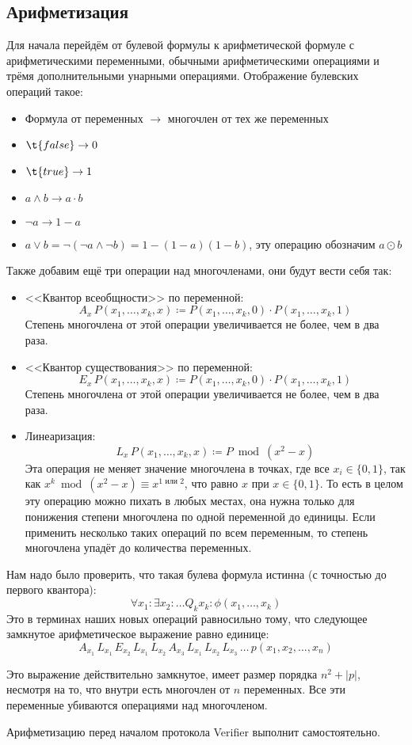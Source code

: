\subsection{Арифметизация}
	Для начала перейдём от булевой формулы к арифметической формуле с арифметическими переменными, обычными арифметическими операциями и трёмя дополнительными унарными операциями.
	Отображение булевских операций такое:
	\begin{itemize}
		\item Формула от переменных $\to$ многочлен от тех же переменных
		\item $\t{false} \to 0$
		\item $\t{true} \to 1$
		\item $a \land b \to a \cdot b$
		\item $\lnot a \to 1 - a$
		\item $a \lor b = \lnot (\lnot a \land \lnot b) = 1 - (1-a)(1-b)$, эту операцию обозначим $a \odot b$
	\end{itemize}
	Также добавим ещё три операции над многочленами, они будут вести себя так:
	\begin{itemize}
		\item <<Квантор всеобщности>> по переменной:
			\[ A_x\,P(x_1, \dots, x_k, x) \coloneq P(x_1, \dots, x_k, 0) \cdot P(x_1, \dots, x_k, 1) \]
			Степень многочлена от этой операции увеличивается не более, чем в два раза.
		\item <<Квантор существования>> по переменной:
			\[ E_x\,P(x_1, \dots, x_k, x) \coloneq P(x_1, \dots, x_k, 0) \cdot P(x_1, \dots, x_k, 1) \]
			Степень многочлена от этой операции увеличивается не более, чем в два раза.
		\item Линеаризация:
			\[ L_x\,P(x_1, \dots, x_k, x) \coloneq P \bmod (x^2 - x) \]
			Эта операция не меняет значение многочлена в точках, где все $x_i \in \{0, 1\}$, так как $x^k \bmod (x^2-x) \equiv x^{1\text{~или~}2}$,
			что равно $x$ при $x \in \{0, 1\}$.
			То есть в целом эту операцию можно пихать в любых местах, она нужна только для понижения степени многочлена по одной переменной до единицы.
			Если применить несколько таких операций по всем переменным, то степень многочлена упадёт до количества переменных.
	\end{itemize}
	Нам надо было проверить, что такая булева формула истинна (с точностью до первого квантора):
	\[ \forall x_1 \colon \exists x_2 \colon \dots Q_k x_k \colon \phi(x_1, \dots, x_k) \]
	Это в терминах наших новых операций равносильно тому, что следующее замкнутое арифметическое выражение равно единице:
	\[
		A_{x_1}\,L_{x_1} \,
		E_{x_2}\,L_{x_1} \, L_{x_2} \,
		A_{x_3}\,L_{x_1} \, L_{x_2} \, L_{x_3} \,
		\dots \,
		p(x_1, x_2, \dots, x_n)
	\]
	\begin{Rem}
		Это выражение действительно замкнутое, имеет размер порядка $n^2+|p|$, несмотря на то, что внутри есть многочлен от $n$ переменных.
		Все эти переменные убиваются операциями над многочленом.
	\end{Rem}
	Арифметизацию перед началом протокола Verifier выполнит самостоятельно.


